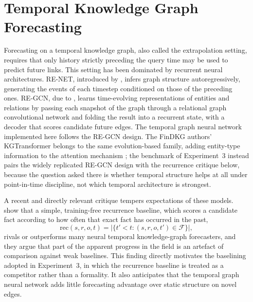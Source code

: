 \documentclass[a4paper,12pt]{report}
\begin{document}
\section{Temporal Knowledge Graph Forecasting}
Forecasting on a temporal knowledge graph, also called the extrapolation setting,
requires that only history strictly preceding the query time may be used to
predict future links. This setting has been dominated by recurrent neural
architectures. RE-NET, introduced by \citet{Jin2020RENET}, infers graph structure
autoregressively, generating the events of each timestep conditioned on those of
the preceding ones. RE-GCN, due to \citet{Li2021REGCN}, learns time-evolving
representations of entities and relations by passing each snapshot of the graph
through a relational graph convolutional network and folding the result into a
recurrent state, with a decoder that scores candidate future edges. The temporal
graph neural network implemented here follows the RE-GCN design.
The FinDKG authors' KGTransformer belongs to the same evolution-based
family, adding entity-type information to the attention mechanism
\citep{Li2024FinDKG}; the benchmark of Experiment~3 instead pairs the
widely replicated RE-GCN design with the recurrence critique below,
because the question asked there is whether temporal structure helps at
all under point-in-time discipline, not which temporal architecture is
strongest.

A recent and directly relevant critique tempers expectations of these models.
\citet{Gastinger2024Recurrence} show that a simple, training-free recurrence
baseline, which scores a candidate fact according to how often that exact fact
has occurred in the past,
\begin{equation}
\mathrm{rec}(s, r, o, t) = \bigl| \{ t' < t : (s, r, o, t') \in
\mathcal{F} \} \bigr|,
\label{eq:recurrence}
\end{equation}
rivals or outperforms many neural temporal
knowledge-graph forecasters, and they argue that part of the apparent progress in
the field is an artefact of comparison against weak baselines. This finding
directly motivates the baselining adopted in Experiment~3, in which the
recurrence baseline is treated as a competitor rather than a
formality. It
also anticipates that the temporal
graph neural network adds little forecasting advantage over static
structure on novel edges.
\end{document}
